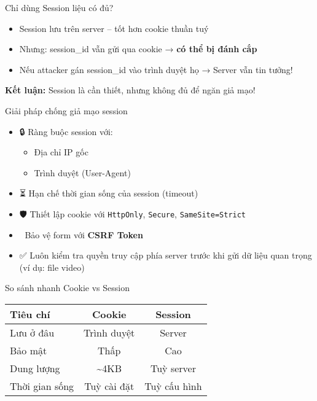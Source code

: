 \documentclass[aspectratio=169]{beamer}
\begin{document}
\begin{frame}{Chỉ dùng Session liệu có đủ?}
\begin{itemize}
  \item Session lưu trên server – tốt hơn cookie thuần tuý
  \item Nhưng: session\_id vẫn gửi qua cookie → \textbf{có thể bị đánh cắp}
  \item Nếu attacker gán session\_id vào trình duyệt họ → Server vẫn tin tưởng!
\end{itemize}

\vspace{1em}
\textbf{Kết luận:} Session là cần thiết, nhưng \alert{không đủ} để ngăn giả mạo!
\end{frame}

\begin{frame}{Giải pháp chống giả mạo session}
\begin{itemize}
  \item 🔒 Ràng buộc session với:
  \begin{itemize}
    \item Địa chỉ IP gốc
    \item Trình duyệt (User-Agent)
  \end{itemize}

  \item ⏳ Hạn chế thời gian sống của session (timeout)
  \item 🛡 Thiết lập cookie với \texttt{HttpOnly}, \texttt{Secure}, \texttt{SameSite=Strict}
  \item 🔐 Bảo vệ form với \textbf{CSRF Token}
  \item ✅ Luôn kiểm tra quyền truy cập phía server trước khi gửi dữ liệu quan trọng (ví dụ: file video)
\end{itemize}
\end{frame}

\begin{frame}{So sánh nhanh Cookie vs Session}
  \centering
  \renewcommand{\arraystretch}{1.5}
  \begin{tabular}{|l|c|c|}
    \hline
    \textbf{Tiêu chí} & \textbf{Cookie} & \textbf{Session} \\
    \hline
    Lưu ở đâu         & Trình duyệt     & Server \\
    \hline
    Bảo mật           & Thấp            & Cao \\
    \hline
    Dung lượng        & \textasciitilde 4KB & Tuỳ server \\
    \hline
    Thời gian sống    & Tuỳ cài đặt     & Tuỳ cấu hình \\
    \hline
  \end{tabular}
\end{frame}
\end{document}
